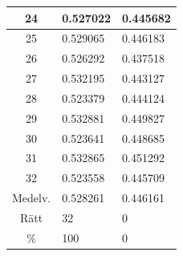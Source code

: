\documentclass[a4paper,10pt]{article}
\begin{document}
\begin{centering}
{\begin{tabular}{ l | l | l| }
\multicolumn{1}{|c|}{24}   & 0.527022 & 0.445682 \\ \hline
\multicolumn{1}{|c|}{25}   & 0.529065 & 0.446183 \\ \hline
\multicolumn{1}{|c|}{26}   & 0.526292 & 0.437518 \\ \hline
\multicolumn{1}{|c|}{27}   & 0.532195 & 0.443127 \\ \hline
\multicolumn{1}{|c|}{28}   & 0.523379 & 0.444124 \\ \hline
\multicolumn{1}{|c|}{29}   & 0.532881 & 0.449827 \\ \hline
\multicolumn{1}{|c|}{30}   & 0.523641 & 0.448685 \\ \hline
\multicolumn{1}{|c|}{31}   & 0.532865 & 0.451292 \\ \hline
\multicolumn{1}{|c|}{32}   & 0.523558 & 0.445709 \\ \hline\hline
\multicolumn{1}{|c|}{Medelv.} & 0.528261 & 0.446161\\ \hline
\multicolumn{1}{|c|}{Rätt} & 32 & 0\\ \hline
\multicolumn{1}{|c|}{\%} & 100 & 0 \\ \hline
\end{tabular}

}
\end{centering}
\end{document}
